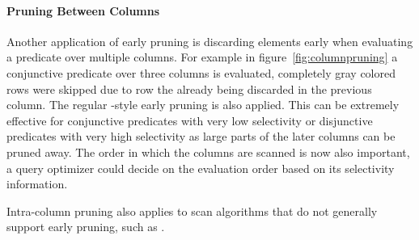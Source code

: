 \paragraph{Pruning Between Columns}

Another application of early pruning is discarding elements early when
evaluating a predicate over multiple columns. For example in
figure~\ref{fig:columnpruning} a conjunctive predicate over three columns is
evaluated, completely gray colored rows were skipped due to row the already being
discarded in the previous column. The regular \bwv{}-style early pruning is
also applied. This can be extremely effective for conjunctive predicates with
very low selectivity or disjunctive predicates with very high selectivity as
large parts of the later columns can be pruned away.  The order in which the
columns are scanned is now also important, a query optimizer could decide on the
evaluation order based on its selectivity information. 

Intra-column pruning also applies to scan algorithms that do not generally
support early pruning, such as \simdscan{}.

